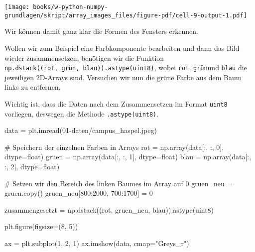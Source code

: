 \documentclass[
  letterpaper,
  DIV=11,
  numbers=noendperiod]{scrreprt}
\newenvironment{Shaded}{\begin{snugshade}}{\end{snugshade}}
\newcommand{\BuiltInTok}[1]{\textcolor[rgb]{0.00,0.23,0.31}{#1}}
\newcommand{\CommentTok}[1]{\textcolor[rgb]{0.37,0.37,0.37}{#1}}
\newcommand{\DecValTok}[1]{\textcolor[rgb]{0.68,0.00,0.00}{#1}}
\newcommand{\NormalTok}[1]{\textcolor[rgb]{0.00,0.23,0.31}{#1}}
\newcommand{\OperatorTok}[1]{\textcolor[rgb]{0.37,0.37,0.37}{#1}}
\newcommand{\StringTok}[1]{\textcolor[rgb]{0.13,0.47,0.30}{#1}}
\begin{document}
\begin{tcolorbox}
\texttt{[image: books/w-python-numpy-grundlagen/skript/array\_images\_files/figure-pdf/cell-9-output-1.pdf]}

Wir können damit ganz klar die Formen des Fensters erkennen.

Wollen wir zum Beispiel eine Farbkomponente bearbeiten und dann das Bild
wieder zusammensetzen, benötigen wir die Funktion
\texttt{np.dstack((rot,\ grün,\ blau)).astype(\textquotesingle{}uint8\textquotesingle{})},
wobei \texttt{rot}, \texttt{grün}und \texttt{blau} die jeweiligen
2D-Arrays sind. Versuchen wir nun die grüne Farbe aus dem Baum links zu
entfernen.

Wichtig ist, dass die Daten nach dem Zusammensetzen im Format
\texttt{uint8} vorliegen, deswegen die Methode
\texttt{.astype(\textquotesingle{}uint8\textquotesingle{})}.

\begin{Shaded}
\begin{Highlighting}[]
\NormalTok{data }\OperatorTok{=}\NormalTok{ plt.imread(}\StringTok{\textquotesingle{}01{-}daten/campus\_haspel.jpeg\textquotesingle{}}\NormalTok{)}

\CommentTok{\# Speichern der einzelnen Farben in Arrays}
\NormalTok{rot }\OperatorTok{=}\NormalTok{ np.array(data[:, :, }\DecValTok{0}\NormalTok{], dtype}\OperatorTok{=}\BuiltInTok{float}\NormalTok{)}
\NormalTok{gruen }\OperatorTok{=}\NormalTok{ np.array(data[:, :, }\DecValTok{1}\NormalTok{], dtype}\OperatorTok{=}\BuiltInTok{float}\NormalTok{)}
\NormalTok{blau }\OperatorTok{=}\NormalTok{ np.array(data[:, :, }\DecValTok{2}\NormalTok{], dtype}\OperatorTok{=}\BuiltInTok{float}\NormalTok{)}

\CommentTok{\# Setzen wir den Bereich des linken Baumes im Array auf 0}
\NormalTok{gruen\_neu }\OperatorTok{=}\NormalTok{ gruen.copy()}
\NormalTok{gruen\_neu[}\DecValTok{800}\NormalTok{:}\DecValTok{2000}\NormalTok{, }\DecValTok{700}\NormalTok{:}\DecValTok{1700}\NormalTok{] }\OperatorTok{=} \DecValTok{0}

\NormalTok{zusammengesetzt }\OperatorTok{=}\NormalTok{ np.dstack((rot, gruen\_neu, blau)).astype(}\StringTok{\textquotesingle{}uint8\textquotesingle{}}\NormalTok{)}

\NormalTok{plt.figure(figsize}\OperatorTok{=}\NormalTok{(}\DecValTok{8}\NormalTok{, }\DecValTok{5}\NormalTok{))}

\NormalTok{ax }\OperatorTok{=}\NormalTok{ plt.subplot(}\DecValTok{1}\NormalTok{, }\DecValTok{2}\NormalTok{, }\DecValTok{1}\NormalTok{)}
\NormalTok{ax.imshow(data, cmap}\OperatorTok{=}\StringTok{"Greys\_r"}\NormalTok{)}


\end{Highlighting}
\end{Shaded}
\end{tcolorbox}
\end{document}
